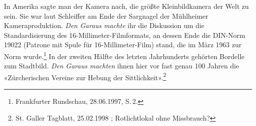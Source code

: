 \eal
%
%
\ex In Amerika sagte man der Kamera nach, die größte Kleinbildkamera der Welt zu sein. Sie war laut Schleiffer am Ende der Sargnagel der Mühlheimer Kameraproduktion. 
\emph{Den Garaus machte} ihr die Diskussion um die Standardisierung des 16-Millimeter-Filmformats, an dessen Ende die DIN-Norm 19022 (Patrone mit Spule für 16-Millimeter-Film) stand, die im März 1963 zur Norm wurde.\footnote{
Frankfurter Rundschau, 28.06.1997, S.\,2. %
}
\ex
In der zweiten Hälfte des letzten Jahrhunderts gehörten Bordelle zum Stadtbild. 
\emph{Den Garaus machten} ihnen hier vor fast genau 100 Jahren die «Zürcherischen Vereine zur Hebung der Sittlichkeit».\footnote{
St. Galler Tagblatt, 25.02.1998 ; Rotlichtlokal ohne Missbrauch?
}





